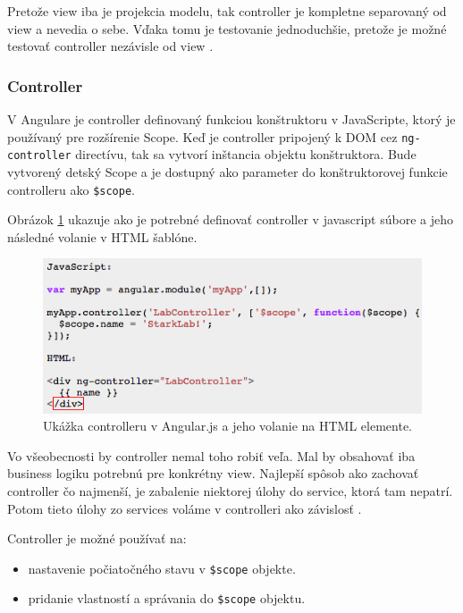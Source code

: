 Pretože view iba je projekcia modelu, tak controller je kompletne separovaný od view a nevedia o sebe. Vďaka tomu je testovanie jednoduchšie, pretože je možné testovať controller nezávisle od view \cite{angular-docs}.

\subsubsection{Controller}
V Angulare je controller definovaný funkciou konštruktoru v JavaScripte, ktorý je používaný pre rozšírenie Scope. Keď je controller pripojený k DOM cez \verb|ng-controller| directívu, tak sa vytvorí inštancia objektu konštruktora. Bude vytvorený detský Scope a je dostupný ako parameter do konštruktorovej funkcie controlleru ako \verb|$scope|.

Obrázok \ref{img-angular-controller-def} ukazuje ako je potrebné definovať controller v javascript súbore a jeho následné volanie v HTML šablóne.

\begin{figure}[H]
  \centering
  \includegraphics[scale=0.7]{img/code/angular-controller-def.png}
  \caption{Ukážka controlleru v Angular.js a jeho volanie na HTML elemente.}
  \label{img-angular-controller-def}
\end{figure}

Vo všeobecnosti by controller nemal toho robiť veľa. Mal by obsahovať iba business logiku potrebnú pre konkrétny view. Najlepší spôsob ako zachovať controller čo najmenší, je zabalenie niektorej úlohy do service, ktorá tam nepatrí. Potom tieto úlohy zo services voláme v controlleri ako závislosť \cite{angular-docs}.

\noindent Controller je možné používať na:
\begin{itemize}
\item nastavenie počiatočného stavu v \verb|$scope| objekte.
\item pridanie vlastností a správania do \verb|$scope| objektu.\\
\end{itemize}

